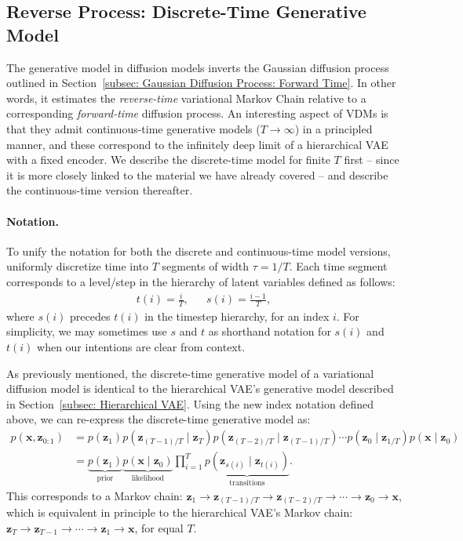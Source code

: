 \newpage
\subsection{Reverse Process: Discrete-Time Generative Model}
\label{subsec: Discrete-time Generative Model}
%
The generative model in diffusion models inverts the Gaussian diffusion process outlined in Section~\ref{subsec: Gaussian Diffusion Process: Forward Time}. In other words, it estimates the \textit{reverse-time} variational Markov Chain relative to a corresponding \textit{forward-time} diffusion process. An interesting aspect of VDMs is that they admit continuous-time generative models ($T \to \infty$) in a principled manner, and these correspond to the infinitely deep limit of a hierarchical VAE with a fixed encoder. We describe the discrete-time model for finite $T$ first -- since it is more closely linked to the material we have already covered -- and describe the continuous-time version thereafter. 

\paragraph{Notation.} To unify the notation for both the discrete and continuous-time model versions, \cite{kingma2021variational} uniformly discretize time into $T$ segments of width $\tau = 1/T$. Each time segment corresponds to a level/step in the hierarchy of latent variables defined as follows: 
%
\begin{align}
    && t(i) = \frac{i}{T}, && s(i) = \frac{i-1}{T}, &&
\end{align}
%
where $s(i)$ precedes $t(i)$ in the timestep hierarchy, for an index $i$. For simplicity, we may sometimes use $s$ and $t$ as shorthand notation for $s(i)$ and $t(i)$ when our intentions are clear from context. 

As previously mentioned, the discrete-time generative model of a variational diffusion model is identical to the hierarchical VAE's generative model described in Section~\ref{subsec: Hierarchical VAE}. Using the new index notation defined above, we can re-express the discrete-time generative model as:
%
\begin{align}
    p(\mathbf{x}, \mathbf{z}_{0:1}) & = p(\mathbf{z}_1)p(\mathbf{z}_{(T-1)/T} \mid \mathbf{z}_T)
    p(\mathbf{z}_{(T-2)/T} \mid \mathbf{z}_{(T-1)/T})
    \cdots p(\mathbf{z}_0 \mid \mathbf{z}_{1/T})p(\mathbf{x} \mid \mathbf{z}_0) \\[5pt]& = \underbrace{p(\mathbf{z}_1)}_{\mathrm{prior}} \underbrace{p(\mathbf{x} \mid \mathbf{z}_0)}_{\mathrm{likelihood}} \prod_{i=1}^T \underbrace{p(\mathbf{z}_{s(i)} \mid \mathbf{z}_{t(i)})}_{\mathrm{transitions}}.
\end{align}
%
This corresponds to a Markov chain: $\mathbf{z}_1 \to \mathbf{z}_{(T-1)/T} \to \mathbf{z}_{(T-2)/T} \to \cdots \to \mathbf{z}_0 \to \mathbf{x}$, which is equivalent in principle to the hierarchical VAE's Markov chain: $\mathbf{z}_T \to \mathbf{z}_{T-1} \to \cdots \to \mathbf{z}_1 \to \mathbf{x}$, for equal $T$.

